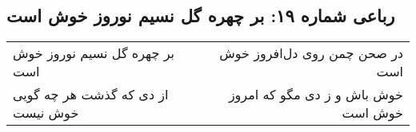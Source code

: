 \begin{center}
\section*{رباعی شماره ۱۹: بر چهره گل نسیم نوروز خوش است}
\label{sec:sh019}
\begin{longtable}{l p{0.5cm} r}
بر چهره گل نسیم نوروز خوش است
&&
در صحن چمن روی دل‌افروز خوش است
\\
از دی که گذشت هر چه گویی خوش نیست
&&
خوش باش و ز دی مگو که امروز خوش است
\\
\end{longtable}
\end{center}
